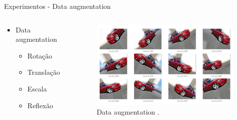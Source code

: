 \begin{frame}{Experimentos - Data augmentation}

    \begin{columns}
    \begin{column}{0.4\textwidth}
      \begin{itemize}
        \item Data augmentation
        \begin{itemize}
            \item Rotação
            \item Translação
            \item Escala
            \item Reflexão
        \end{itemize}
      \end{itemize}
    \end{column}
    
    \begin{column}{0.6\textwidth}
        \begin{figure}
    \centering
    \includegraphics[width=1.0\linewidth]{img/data_augmentation.png}
    \caption{Data augmentation \cite{amaratunga_1970}.}
  \end{figure}
    \end{column}
    
\end{columns} 

\end{frame}

